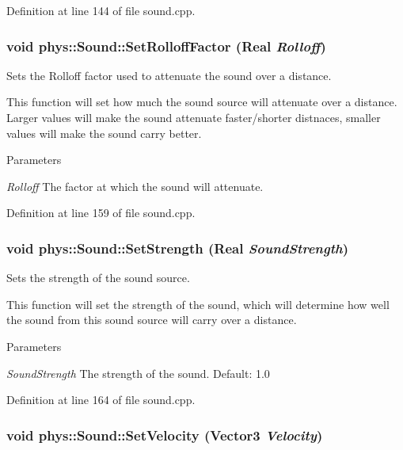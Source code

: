 Definition at line 144 of file sound.cpp.

\hypertarget{classphys_1_1Sound_a56e657013dc4d561dbc3b0c5d12d542d}{
\subsubsection[{SetRolloffFactor}]{\setlength{\rightskip}{0pt plus 5cm}void phys::Sound::SetRolloffFactor ({\bf Real} {\em Rolloff})}}
\label{dc/d2f/classphys_1_1Sound_a56e657013dc4d561dbc3b0c5d12d542d}


Sets the Rolloff factor used to attenuate the sound over a distance. 

This function will set how much the sound source will attenuate over a distance. Larger values will make the sound attenuate faster/shorter distnaces, smaller values will make the sound carry better. 
\begin{DoxyParams}{Parameters}
\item[{\em Rolloff}]The factor at which the sound will attenuate. \end{DoxyParams}


Definition at line 159 of file sound.cpp.

\hypertarget{classphys_1_1Sound_a44d6c066fad6f09553e47892a14bf5ef}{
\subsubsection[{SetStrength}]{\setlength{\rightskip}{0pt plus 5cm}void phys::Sound::SetStrength ({\bf Real} {\em SoundStrength})}}
\label{dc/d2f/classphys_1_1Sound_a44d6c066fad6f09553e47892a14bf5ef}


Sets the strength of the sound source. 

This function will set the strength of the sound, which will determine how well the sound from this sound source will carry over a distance. 
\begin{DoxyParams}{Parameters}
\item[{\em SoundStrength}]The strength of the sound. Default: 1.0 \end{DoxyParams}


Definition at line 164 of file sound.cpp.

\hypertarget{classphys_1_1Sound_a673a0ab44fa32fdcd15180e813b7b02b}{
\subsubsection[{SetVelocity}]{\setlength{\rightskip}{0pt plus 5cm}void phys::Sound::SetVelocity ({\bf Vector3} {\em Velocity})}}
\label{dc/d2f/classphys_1_1Sound_a673a0ab44fa32fdcd15180e813b7b02b}


